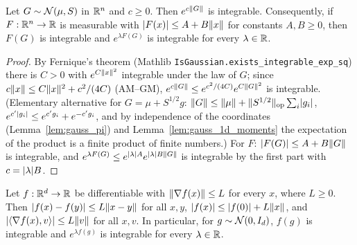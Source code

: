 \begin{lemma}\label{lem:pc_exp_norm_integrable}
\leanok
{}
Let $G \sim \mathcal{N}(\mu, S)$ in $\mathbb{R}^n$ and $c \ge 0$. Then $e^{c\lVert G \rVert}$ is integrable.
Consequently, if $F : \mathbb{R}^n \to \mathbb{R}$ is measurable with $\lvert F(x) \rvert \le A + B\lVert x \rVert$ for
constants $A, B \ge 0$, then $F(G)$ is integrable and $e^{\lambda F(G)}$ is integrable for every
$\lambda \in \mathbb{R}$.
\end{lemma}

\begin{proof}
\leanok
{}
By Fernique's theorem (Mathlib \texttt{IsGaussian.exists\_integrable\_exp\_sq}) there is
$C > 0$ with $e^{C\lVert x \rVert^2}$ integrable under the law of $G$; since
$c\lVert x \rVert \le C\lVert x \rVert^2 + c^2/(4C)$ (AM--GM), $e^{c\lVert G \rVert} \le e^{c^2/(4C)}e^{C\lVert G \rVert^2}$
is integrable. (Elementary alternative for $G = \mu + S^{1/2}g$: $\lVert G \rVert \le \lVert \mu \rVert +
\lVert S^{1/2} \rVert_{\mathrm{op}}\sum_i\lvert g_i \rvert$, $e^{c'\lvert g_i \rvert} \le e^{c'g_i} + e^{-c'g_i}$, and
by independence of the coordinates (Lemma~\ref{lem:gauss_pi}) and
Lemma~\ref{lem:gauss_1d_moments} the expectation of the product is a finite product of finite
numbers.) For $F$: $\lvert F(G) \rvert \le A + B\lVert G \rVert$ is integrable, and
$e^{\lambda F(G)} \le e^{\lvert \lambda \rvert A}e^{\lvert \lambda \rvert B\lVert G \rVert}$ is integrable by the first
part with $c = \lvert \lambda \rvert B$.
\end{proof}

\begin{lemma}\label{lem:pc_lipschitz_of_grad}
\leanok
Let $f : \mathbb{R}^d \to \mathbb{R}$ be differentiable with $\lVert \nabla f(x) \rVert \le L$ for every $x$, where
$L \ge 0$. Then $\lvert f(x) - f(y) \rvert \le L\lVert x-y \rVert$ for all $x,y$, $\lvert f(x) \rvert \le \lvert f(0) \rvert +
L\lVert x \rVert$, and $\lvert \langle \nabla f(x), v \rangle \rvert \le L\lVert v \rVert$ for all $x, v$. In particular, for
$g \sim \mathcal{N}(0,I_d)$, $f(g)$ is integrable and $e^{\lambda f(g)}$ is integrable for every
$\lambda\in\mathbb{R}$.
\end{lemma}

